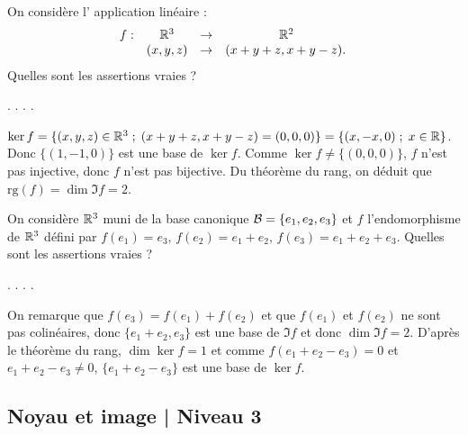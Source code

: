 \begin{question}
On considère l' application linéaire : 
$$\begin{array}{rccc}f:&\mathbb{R}^3&\to&\mathbb{R}^2\\
& (x,y,z)&\to &(x+y+z, x+y-z). \,  \end{array}$$
Quelles sont les assertions vraies ?
\begin{answers}  
.
.
.
.   
\end{answers}
\begin{explanations}  $\ker f = \{(x,y,z) \in \mathbb{R}^3 \; ; \; (x+y+z,x+y-z)=(0,0,0)\} =\{(x,-x,0)  \; ; \; x\in \mathbb{R}\}$. Donc $ \{(1,-1,0)\}$ est une base de $\ker f$. Comme $\ker f \neq \{(0,0,0)\}$, $f$ n'est pas injective, donc $f$ n'est pas bijective. Du théorème du rang, on déduit que $\mbox{rg} (f)= \dim \Im f = 2$.
\end{explanations}
\end{question}

\begin{question}
On considère $\mathbb{R}^3$ muni de la base canonique ${\cal{ B}}= \{e_1,e_2,e_3\}$ et $f$ l'endomorphisme de $\mathbb{R}^3$ défini par 
$f(e_1)= e_3,\, f(e_2)= e_1+e_2,\,  f(e_3)= e_1+e_2+e_3$. 
Quelles sont les assertions vraies ?
\begin{answers}  
.
.
.
.
\end{answers}
\begin{explanations}  On remarque que $f(e_3)= f(e_1)+f(e_2) $ et que $f(e_1)$ et $f(e_2)$ ne sont pas colinéaires, donc $\{e_1+e_2,e_3\}$ est une base de $\Im f$ et donc $\dim \Im f =2$.
\vskip0mm
D'après le théorème du rang, $\dim \ker f = 1 $ et comme $f(e_1+e_2-e_3) = 0$ et  $e_1+e_2-e_3 \neq 0$, $\{e_1+e_2-e_3\}$ est une base de $\ker f$.
\end{explanations}
\end{question}

\subsection{Noyau et image  | Niveau 3}

